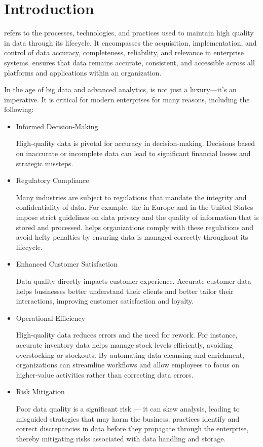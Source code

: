 \chapter*{Introduction}

 refers to the processes, technologies, and practices used to maintain high quality in data through its lifecycle. It encompasses the acquisition, implementation, and control of data accuracy, completeness, reliability, and relevance in enterprise systems.  ensures that data remains accurate, consistent, and accessible across all platforms and applications within an organization.

In the age of big data and advanced analytics,  is not just a luxury—it's an imperative. It is critical for modern enterprises for many reasons, including the following:

\begin{itemize}
\item Informed Decision-Making

High-quality data is pivotal for accuracy in decision-making. Decisions based on inaccurate or incomplete data can lead to significant financial losses and strategic missteps.

\item Regulatory Compliance

Many industries are subject to regulations that mandate the integrity and confidentiality of data. For example, the  in Europe and  in the United States impose strict guidelines on data privacy and the quality of information that is stored and processed.
     helps organizations comply with these regulations and avoid hefty penalties by ensuring data is managed correctly throughout its lifecycle.

\item Enhanced Customer Satisfaction

Data quality directly impacts customer experience. Accurate customer data helps businesses better understand their clients and better tailor their interactions, improving customer satisfaction and loyalty.

\item Operational Efficiency

High-quality data reduces errors and the need for rework. For instance, accurate inventory data helps manage stock levels efficiently, avoiding overstocking or stockouts.
By automating data cleansing and enrichment, organizations can streamline workflows and allow employees to focus on higher-value activities rather than correcting data errors.    

\item Risk Mitigation

Poor data quality is a significant risk — it can skew analysis, leading to misguided strategies that may harm the business.
 practices identify and correct discrepancies in data before they propagate through the enterprise, thereby mitigating risks associated with data handling and storage.
\end{itemize}


